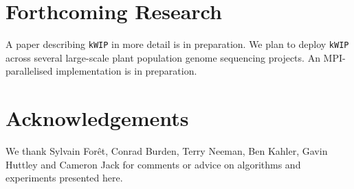 \documentclass[a0,portrait]{a0poster}
\begin{document}
\begin{multicols}{2}
\normalsize
\color{Black}


\section*{Forthcoming Research}

A paper describing \texttt{kWIP} in more detail is in preparation. We plan to
deploy \texttt{kWIP} across several large-scale plant population genome
sequencing projects. An MPI-parallelised implementation is in preparation.


\section*{Acknowledgements}

We thank Sylvain For\^{e}t, Conrad Burden, Terry Neeman, Ben Kahler, Gavin
Huttley and Cameron Jack for comments or advice on algorithms and experiments
presented here.


\tiny
\printbibliography
\normalsize

\end{multicols}
\end{document}
